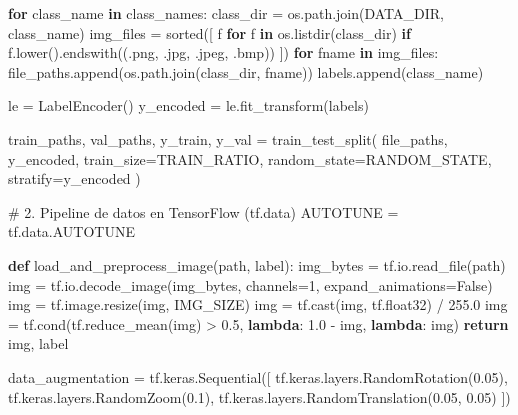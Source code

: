 \documentclass[
  spanish,
  us-letterpaper,
]{scrreprt}
\newenvironment{Shaded}{\begin{snugshade}}{\end{snugshade}}
\newcommand{\BuiltInTok}[1]{\textcolor[rgb]{0.00,0.23,0.31}{#1}}
\newcommand{\CommentTok}[1]{\textcolor[rgb]{0.37,0.37,0.37}{#1}}
\newcommand{\ControlFlowTok}[1]{\textcolor[rgb]{0.00,0.23,0.31}{\textbf{#1}}}
\newcommand{\DecValTok}[1]{\textcolor[rgb]{0.68,0.00,0.00}{#1}}
\newcommand{\FloatTok}[1]{\textcolor[rgb]{0.68,0.00,0.00}{#1}}
\newcommand{\KeywordTok}[1]{\textcolor[rgb]{0.00,0.23,0.31}{\textbf{#1}}}
\newcommand{\NormalTok}[1]{\textcolor[rgb]{0.00,0.23,0.31}{#1}}
\newcommand{\OperatorTok}[1]{\textcolor[rgb]{0.37,0.37,0.37}{#1}}
\newcommand{\StringTok}[1]{\textcolor[rgb]{0.13,0.47,0.30}{#1}}
\newcommand{\VariableTok}[1]{\textcolor[rgb]{0.07,0.07,0.07}{#1}}
\theoremstyle{definition}
\theoremstyle{remark}
\begin{document}
\begin{Shaded}
\begin{Highlighting}[]
\ControlFlowTok{for}\NormalTok{ class\_name }\KeywordTok{in}\NormalTok{ class\_names:}
\NormalTok{    class\_dir }\OperatorTok{=}\NormalTok{ os.path.join(DATA\_DIR, class\_name)}
\NormalTok{    img\_files }\OperatorTok{=} \BuiltInTok{sorted}\NormalTok{([}
\NormalTok{        f }\ControlFlowTok{for}\NormalTok{ f }\KeywordTok{in}\NormalTok{ os.listdir(class\_dir)}
        \ControlFlowTok{if}\NormalTok{ f.lower().endswith((}\StringTok{\textquotesingle{}.png\textquotesingle{}}\NormalTok{, }\StringTok{\textquotesingle{}.jpg\textquotesingle{}}\NormalTok{, }\StringTok{\textquotesingle{}.jpeg\textquotesingle{}}\NormalTok{, }\StringTok{\textquotesingle{}.bmp\textquotesingle{}}\NormalTok{))}
\NormalTok{    ])}
    \ControlFlowTok{for}\NormalTok{ fname }\KeywordTok{in}\NormalTok{ img\_files:}
\NormalTok{        file\_paths.append(os.path.join(class\_dir, fname))}
\NormalTok{        labels.append(class\_name)}

\NormalTok{le }\OperatorTok{=}\NormalTok{ LabelEncoder()}
\NormalTok{y\_encoded }\OperatorTok{=}\NormalTok{ le.fit\_transform(labels)}

\NormalTok{train\_paths, val\_paths, y\_train, y\_val }\OperatorTok{=}\NormalTok{ train\_test\_split(}
\NormalTok{    file\_paths, y\_encoded,}
\NormalTok{    train\_size}\OperatorTok{=}\NormalTok{TRAIN\_RATIO,}
\NormalTok{    random\_state}\OperatorTok{=}\NormalTok{RANDOM\_STATE,}
\NormalTok{    stratify}\OperatorTok{=}\NormalTok{y\_encoded}
\NormalTok{)}

\CommentTok{\# 2. Pipeline de datos en TensorFlow (tf.data)}
\NormalTok{AUTOTUNE }\OperatorTok{=}\NormalTok{ tf.data.AUTOTUNE}

\KeywordTok{def}\NormalTok{ load\_and\_preprocess\_image(path, label):}
\NormalTok{    img\_bytes }\OperatorTok{=}\NormalTok{ tf.io.read\_file(path)}
\NormalTok{    img }\OperatorTok{=}\NormalTok{ tf.io.decode\_image(img\_bytes, channels}\OperatorTok{=}\DecValTok{1}\NormalTok{, expand\_animations}\OperatorTok{=}\VariableTok{False}\NormalTok{)}
\NormalTok{    img }\OperatorTok{=}\NormalTok{ tf.image.resize(img, IMG\_SIZE)}
\NormalTok{    img }\OperatorTok{=}\NormalTok{ tf.cast(img, tf.float32) }\OperatorTok{/} \FloatTok{255.0}
\NormalTok{    img }\OperatorTok{=}\NormalTok{ tf.cond(tf.reduce\_mean(img) }\OperatorTok{\textgreater{}} \FloatTok{0.5}\NormalTok{, }\KeywordTok{lambda}\NormalTok{: }\FloatTok{1.0} \OperatorTok{{-}}\NormalTok{ img, }\KeywordTok{lambda}\NormalTok{: img)}
    \ControlFlowTok{return}\NormalTok{ img, label}

\NormalTok{data\_augmentation }\OperatorTok{=}\NormalTok{ tf.keras.Sequential([}
\NormalTok{    tf.keras.layers.RandomRotation(}\FloatTok{0.05}\NormalTok{),}
\NormalTok{    tf.keras.layers.RandomZoom(}\FloatTok{0.1}\NormalTok{),}
\NormalTok{    tf.keras.layers.RandomTranslation(}\FloatTok{0.05}\NormalTok{, }\FloatTok{0.05}\NormalTok{)}
\NormalTok{])}


\end{Highlighting}
\end{Shaded}
\end{document}
